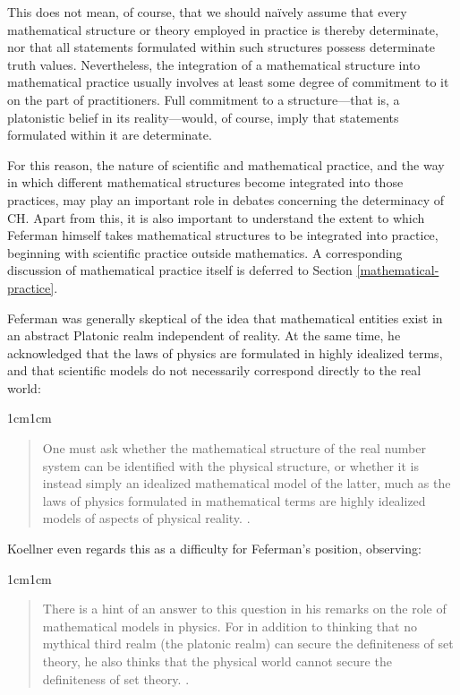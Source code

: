 \documentclass[11pt,a4paper]{article}
\theoremstyle{plain}
\begin{document}
This does not mean, of course, that we should naïvely assume that every mathematical structure or theory employed in practice is thereby determinate, nor that all statements formulated within such structures possess determinate truth values. Nevertheless, the integration of a mathematical structure into mathematical practice usually involves at least some degree of commitment to it on the part of practitioners. Full commitment to a structure—that is, a platonistic belief in its reality—would, of course, imply that statements formulated within it are determinate.

For this reason, the nature of scientific and mathematical practice, and the way in which different mathematical structures become integrated into those practices, may play an important role in debates concerning the determinacy of CH. Apart from this, it is also important to understand the extent to which Feferman himself takes mathematical structures to be integrated into practice, beginning with scientific practice outside mathematics. A corresponding discussion of mathematical practice itself is deferred to Section \ref{mathematical-practice}.

Feferman was generally skeptical of the idea that mathematical entities exist in an abstract Platonic realm independent of reality. At the same time, he acknowledged that the laws of physics are formulated in highly idealized terms, and that scientific models do not necessarily correspond directly to the real world:

\begin{adjustwidth}{1cm}{1cm}
\begin{quote}
\small
One must ask whether the mathematical structure of the real number system can be identified with the physical structure, or whether it is instead simply an idealized mathematical model of the latter, much as the laws of physics formulated in mathematical terms are highly idealized models of aspects of physical reality. \parencite[p. 107]{Feferman1999}.
\end{quote}
\end{adjustwidth}

Koellner even regards this as a difficulty for Feferman's position, observing:

\begin{adjustwidth}{1cm}{1cm}
\begin{quote}
\small
There is a hint of an answer to this question in his remarks on the role of mathematical models in physics. For in addition to thinking that no mythical third realm (the platonic realm) can secure the definiteness of set theory, he also thinks that the physical world cannot secure the definiteness of set theory. \parencite[p. 507]{Koellner2016}.
\end{quote}
\end{adjustwidth}
\end{document}
